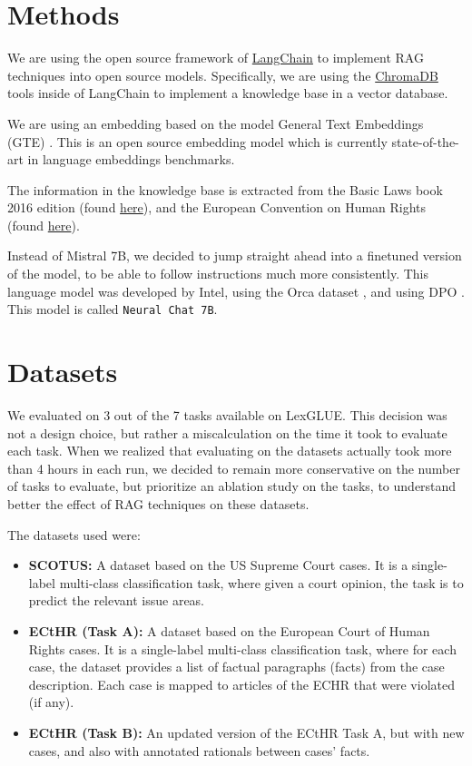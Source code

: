 \documentclass[11pt]{article}
\begin{document}
\section{Methods}
We are using the open source framework of \href{https://github.com/langchain-ai/langchain}{LangChain} to implement RAG techniques into open source models. Specifically, we are using the \href{https://github.com/chroma-core/chroma}{ChromaDB} tools inside of LangChain to implement a knowledge base in a vector database.

We are using an embedding based on the model General Text Embeddings (GTE) \cite{li2023towards}. This is an open source embedding model which is currently state-of-the-art in language embeddings benchmarks.


The information in the knowledge base is extracted from the Basic Laws book 2016 edition (found \href{https://www.archives.gov/files/about/laws/basic-laws-book-2016.pdf}{here}), and the European Convention on Human Rights (found \href{https://www.echr.coe.int/documents/d/echr/convention_ENG}{here}).

Instead of Mistral 7B, we decided to jump straight ahead into a finetuned version of the model, to be able to follow instructions much more consistently. This language model was developed by Intel, using the Orca dataset \cite{mukherjee2023orca}, and using DPO \cite{rafailov2023direct}. This model is called \verb|Neural Chat 7B|.

\section{Datasets}
We evaluated on 3 out of the 7 tasks available on LexGLUE. This decision was not a design choice, but rather a miscalculation on the time it took to evaluate each task. When we realized that evaluating on the datasets actually took more than 4 hours in each run, we decided to remain more conservative on the number of tasks to evaluate, but prioritize an ablation study on the tasks, to understand better the effect of RAG techniques on these datasets.

The datasets used were:
\begin{itemize}
    \item \textbf{SCOTUS:} A dataset based on the US Supreme Court cases. It is a single-label multi-class classification task, where given a court opinion, the task is to predict the relevant issue areas.
    \item \textbf{ECtHR (Task A):} A dataset based on the European Court of Human Rights cases. It is a single-label multi-class classification task, where for each case, the dataset provides a list of factual paragraphs (facts) from the case description. Each case is mapped to articles of the ECHR that were violated (if any).
    \item \textbf{ECtHR (Task B):} An updated version of the ECtHR Task A, but with new cases, and also with annotated rationals between cases' facts.
\end{itemize}
\end{document}
